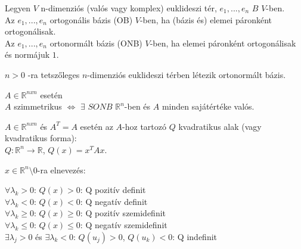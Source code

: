 	\begin{frame}
		\begin{tcolorbox}[title={Def.: Ortogonált, ortonormált bázis}]
 			Legyen $V$ n-dimenziós (valós vagy komplex) euklideszi tér, $e_1, ..., e_n$ $B$ $V$-ben.\\
 			Az $e_1, ..., e_n$ ortogonális bázis (OB) $V$-ben, ha (bázis és) elemei páronként ortogonálisak.\\
 			Az $e_1, ..., e_n$ ortonormált bázis (ONB) $V$-ben, ha elemei páronként ortogonálisak és normájuk $1$.
		\end{tcolorbox}	
		
		\begin{tcolorbox}[title={Tétel: Ortonormált bázis létezése}]
 			$n > 0$ -ra tetszőleges $n$-dimenziós euklideszi térben létezik ortonormált bázis.
		\end{tcolorbox}	
		
		\begin{tcolorbox}[title={Tétel: A valós szimmetrikus mátrixok spektráltétele}]
 			$A \in \mathbb{R}^{n x n}$ esetén\\
 			
			$A$ szimmetrikus $\iff$ $\exists$ $SONB$ $\mathbb{R}^{n}$-ben és $A$ minden sajátértéke valós.
		\end{tcolorbox}	
		
		\begin{tcolorbox}[title={Def.: Quadratikus alak}]
 			$A \in \mathbb{R}^{n x n}$ és $A^T = A$ esetén az $A$-hoz tartozó $Q$ kvadratikus alak (vagy kvadratikus forma):\\
 			$Q : \mathbb{R}^n \rightarrow \mathbb{R}$, $Q(x) = x^TAx$.
		\end{tcolorbox}	
		
		\begin{tcolorbox}[title={Def.: Definitek}]
			$x \in \mathbb{R}^n \setminus {0}$-ra elnevezés:\\
			\mmedskip
			
			${\forall}{\lambda}_k > 0$: $Q(x) > 0$: Q pozitív definit\\
			${\forall}{\lambda}_k < 0$: $Q(x) < 0$: Q negatív definit\\
			${\forall}{\lambda}_k \geq 0$: $Q(x) \geq 0$: Q pozitív szemidefinit\\
			${\forall}{\lambda}_k \leq 0$: $Q(x) \leq 0$: Q negatív szemidefinit\\
			${\exists}{\lambda}_j > 0$ és ${\exists}{\lambda}_k < 0$: $Q(u_j) > 0$, $Q(u_k) < 0$: Q indefinit
		\end{tcolorbox}	
	\end{frame}
	
